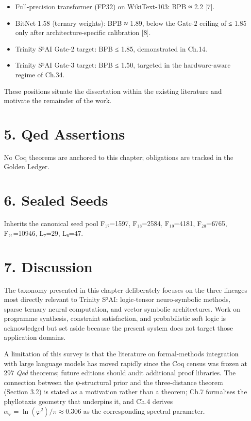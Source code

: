 \begin{itemize}
\tightlist
\item
  Full-precision transformer (FP32) on
  WikiText-103: BPB ≈ 2.2 [7].
\item
  BitNet 1.58 (ternary weights): BPB ≈ 1.89, below
  the Gate-2 ceiling of ≤ 1.85 only after
  architecture-specific calibration [8].
\item
  Trinity S³AI Gate-2 target: BPB ≤ 1.85,
  demonstrated in Ch.14.
\item
  Trinity S³AI Gate-3 target: BPB ≤ 1.50, targeted
  in the hardware-aware regime of Ch.34.
\end{itemize}

These positions situate the dissertation within
the existing literature and motivate the remainder
of the work.

\section{5. Qed
Assertions}\label{fa_02:qed-assertions}

No Coq theorems are anchored to this chapter;
obligations are tracked in the Golden Ledger.

\section{6. Sealed Seeds}\label{fa_02:sealed-seeds}

Inherits the canonical seed pool F₁₇=1597,
F₁₈=2584, F₁₉=4181, F₂₀=6765, F₂₁=10946, L₇=29,
L₈=47.

\section{7. Discussion}\label{fa_02:discussion}

The taxonomy presented in this chapter
deliberately focuses on the three lineages most
directly relevant to Trinity S³AI: logic-tensor
neuro-symbolic methods, sparse ternary neural
computation, and vector symbolic architectures.
Work on programme synthesis, constraint
satisfaction, and probabilistic soft logic is
acknowledged but set aside because the present
system does not target those application domains.

A limitation of this survey is that the literature
on formal-methods integration with large language
models has moved rapidly since the Coq census was
frozen at 297 \emph{Qed} theorems; future editions
should audit additional proof libraries. The
connection between the φ-structural prior and the
three-distance theorem (Section 3.2) is stated as
a motivation rather than a theorem; Ch.7
formalises the phyllotaxis geometry that underpins
it, and Ch.4 derives
\(\alpha_\varphi = \ln(\varphi^2)/\pi \approx 0.306\)
as the corresponding spectral parameter.

